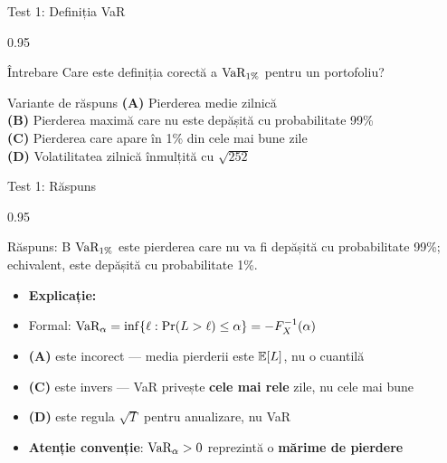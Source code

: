 \documentclass[9pt, aspectratio=169, t]{beamer}
\begin{document}
\begin{frame}[shrink=10]{Test 1: Definiția VaR}
\begin{cminipage}{0.95\textwidth}
    \begin{alertblock}{Întrebare}
    Care este definiția corectă a $\text{VaR}_{1\%}$ pentru un portofoliu?
    \end{alertblock}
    \vspace{0.4cm}
    \begin{block}{Variante de răspuns}
    \textcolor{MainBlue}{\textbf{(A)}} Pierderea medie zilnică \\[3pt]
    \textcolor{MainBlue}{\textbf{(B)}} Pierderea maximă care nu este depășită cu probabilitate 99\% \\[3pt]
    \textcolor{MainBlue}{\textbf{(C)}} Pierderea care apare în 1\% din cele mai bune zile \\[3pt]
    \textcolor{MainBlue}{\textbf{(D)}} Volatilitatea zilnică înmulțită cu $\sqrt{252}$
    \end{block}
\end{cminipage}
\end{frame}

\begin{frame}[shrink=10]{Test 1: Răspuns}
\begin{cminipage}{0.95\textwidth}
    \begin{exampleblock}{Răspuns: B}
    $\text{VaR}_{1\%}$ este pierderea care nu va fi depășită cu probabilitate 99\%; echivalent, este depășită cu probabilitate 1\%.
    \end{exampleblock}
    \vspace{0.2cm}
    \begin{itemize}\setlength{\itemsep}{0pt}
        \item \textbf{Explicație:}
        \item Formal: $\text{VaR}_\alpha = \inf\{\ell : \Pr(L > \ell) \leq \alpha\} = -F_X^{-1}(\alpha)$
        \item \textbf{(A)} este incorect --- media pierderii este $\mathbb{E}[L]$, nu o cuantilă
        \item \textbf{(C)} este invers --- VaR privește \textbf{cele mai rele} zile, nu cele mai bune
        \item \textbf{(D)} este regula $\sqrt{T}$ pentru anualizare, nu VaR
        \item \textbf{Atenție convenție}: $\text{VaR}_\alpha > 0$ reprezintă o \textbf{mărime de pierdere}
    \end{itemize}
\end{cminipage}
\end{frame}
\end{document}
